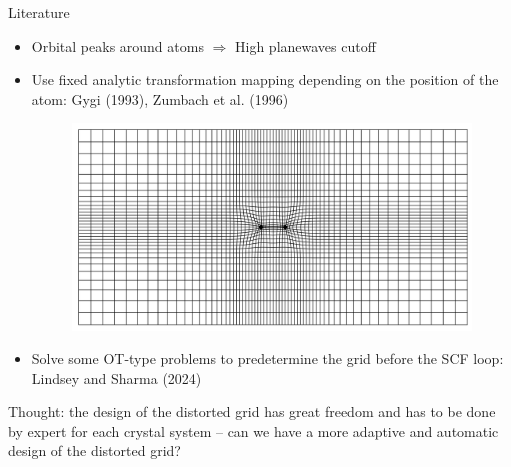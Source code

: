 \documentclass[aspectratio=169]{beamer}
\begin{document}
\begin{frame}{Literature}
	\begin{itemize}
		\item Orbital peaks around atoms $\Longrightarrow$ High planewaves cutoff
		\item Use fixed analytic transformation mapping depending on the position of the
		atom: Gygi (1993), Zumbach et al. (1996)
		\begin{figure}[h]
			\centering
			\includegraphics[width=.4\linewidth]{fig/adpative_grid.jpg}
		\end{figure}
		\item Solve some OT-type problems to predetermine the grid before the SCF
		loop: Lindsey and Sharma (2024)
	\end{itemize}
	
	Thought: the design of the distorted grid has great freedom and has to be done by expert 
	for each crystal system -- can we have a more adaptive and automatic design
	of the distorted grid?
\end{frame}
\end{document}
